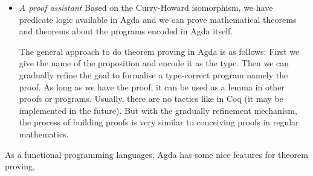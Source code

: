 \begin{itemize}


\item \textit{A proof assistant} Based on the Curry-Howard isomorphism, we have predicate logic available in Agda and we can prove mathematical theorems and theorems about the programs encoded in Agda itself. 

The general approach to do theorem proving in Agda is as follows: First we give the name of the proposition and encode it as the type. Then we can gradually refine the goal to formalise a type-correct program namely the proof. As long as we have the proof, it can be used as a lemma in other proofs or programs. Usually, there are no tactics like in Coq (it may be implemented in the future). But with the gradually refinement mechanism, the process of building proofs is very similar to conceiving proofs in regular mathematics.

\end{itemize}

As a functional programming languages, Agda has some nice features for theorem proving,

